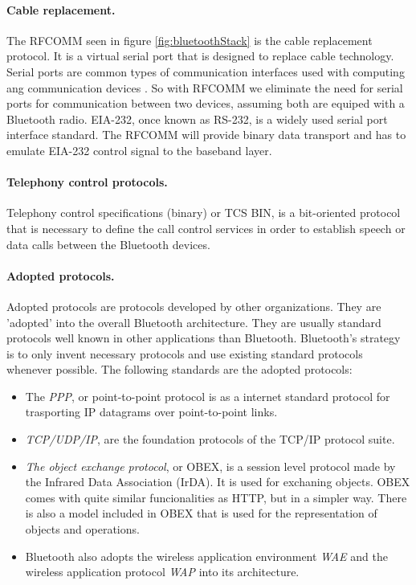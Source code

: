 \documentclass[a4paper, 11pt]{report}
\begin{document}
		\paragraph{Cable replacement.}
The RFCOMM seen in figure \ref{fig:bluetoothStack} is the cable replacement protocol. It is a virtual serial port that is designed to replace cable technology. Serial ports are common types of communication interfaces used with computing ang communication devices \cite{introBluetooth}. So with RFCOMM we eliminate the need for serial ports for communication between two devices, assuming both are equiped with a Bluetooth radio. 
EIA-232, once known as RS-232, is a widely used serial port interface standard. The RFCOMM will provide binary data transport and has to emulate EIA-232 control signal to the baseband layer.

		\paragraph{Telephony control protocols.}
Telephony control specifications (binary) or TCS BIN, is a bit-oriented protocol that is necessary to define the call control services in order to establish speech or data calls between the Bluetooth devices.

		\paragraph{Adopted protocols.}
Adopted protocols are protocols developed by other organizations. They are 'adopted' into the overall Bluetooth architecture. They are usually standard protocols well known in other applications than Bluetooth. Bluetooth's strategy is to only invent necessary protocols and use existing standard protocols whenever possible. The following standards are the adopted protocols:

	\begin{itemize}
		\item The \textit{PPP}, or point-to-point protocol is as a internet standard protocol for trasporting IP datagrams over point-to-point links.
		\item \textit{TCP/UDP/IP}, are the foundation protocols of the TCP/IP protocol suite.
		\item \textit{The object exchange protocol}, or OBEX, is a session level protocol made by the Infrared Data Association (IrDA). It is used for exchaning objects. OBEX comes with quite similar funcionalities as HTTP, but in a simpler way. There is also a model included in OBEX that is used for the representation of objects and operations.
		\item Bluetooth also adopts the wireless application environment \textit{WAE} and the wireless application protocol \textit{WAP} into its architecture.	
	\end{itemize}
\end{document}
